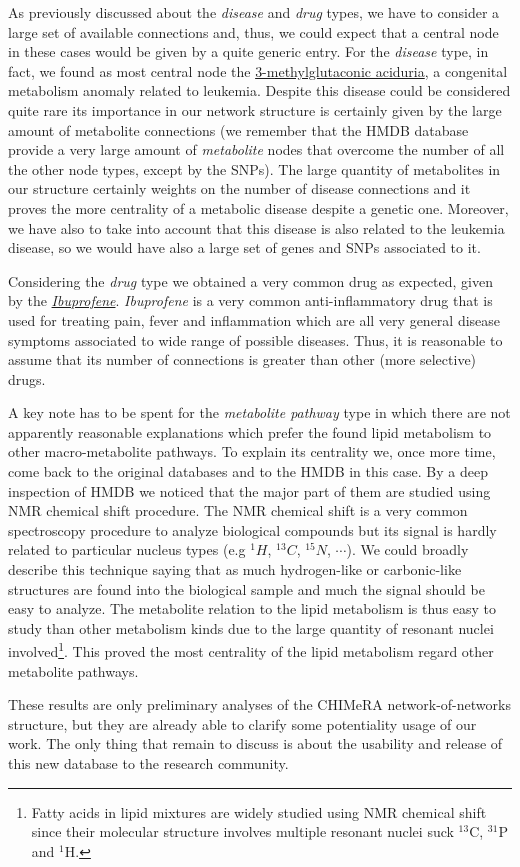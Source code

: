 \documentclass{standalone}
\begin{document}
As previously discussed about the \emph{disease} and \emph{drug} types, we have to consider a large set of available connections and, thus, we could expect that a central node in these cases would be given by a quite generic entry.
For the \emph{disease} type, in fact, we found as most central node the \href{https://en.wikipedia.org/wiki/3-Methylglutaconic_aciduria}{\textsf{3-methylglutaconic aciduria}}, a congenital metabolism anomaly related to leukemia.
Despite this disease could be considered quite rare its importance in our network structure is certainly given by the large amount of metabolite connections (we remember that the HMDB database provide a very large amount of \emph{metabolite} nodes that overcome the number of all the other node types, except by the SNPs).
The large quantity of metabolites in our structure certainly weights on the number of disease connections and it proves the more centrality of a metabolic disease despite a genetic one.
Moreover, we have also to take into account that this disease is also related to the leukemia disease, so we would have also a large set of genes and SNPs associated to it.

Considering the \emph{drug} type we obtained a very common drug as expected, given by the \href{https://en.wikipedia.org/wiki/Ibuprofen}{\emph{Ibuprofene}}.
\emph{Ibuprofene} is a very common anti-inflammatory drug that is used for treating pain, fever and inflammation which are all very general disease symptoms associated to wide range of possible diseases.
Thus, it is reasonable to assume that its number of connections is greater than other (more selective) drugs.

A key note has to be spent for the \emph{metabolite pathway} type in which there are not apparently reasonable explanations which prefer the found \textsf{lipid metabolism} to other macro-metabolite pathways.
To explain its centrality we, once more time, come back to the original databases and to the HMDB in this case.
By a deep inspection of HMDB we noticed that the major part of them are studied using NMR chemical shift procedure.
The NMR chemical shift is a very common spectroscopy procedure to analyze biological compounds but its signal is hardly related to particular nucleus types (e.g $^1H$, $^{13}C$, $^{15}N$, $\cdots$).
We could broadly describe this technique saying that as much hydrogen-like or carbonic-like structures are found into the biological sample and much the signal should be easy to analyze.
The metabolite relation to the lipid metabolism is thus easy to study than other metabolism kinds due to the large quantity of resonant nuclei involved\footnote{
  Fatty acids in lipid mixtures are widely studied using NMR chemical shift since their molecular structure involves multiple resonant nuclei suck $^{13}$C, $^{31}$P and $^1$H.
}.
This proved the most centrality of the \textsf{lipid metabolism} regard other metabolite pathways.

These results are only preliminary analyses of the \textsf{CHIMeRA} network-of-networks structure, but they are already able to clarify some potentiality usage of our work.
The only thing that remain to discuss is about the usability and release of this new database to the research community.
\end{document}

